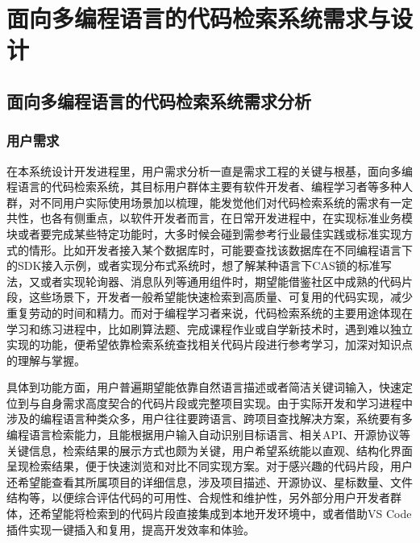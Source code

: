 \documentclass[UTF8,a4paper,12pt]{ctexart}
\numberwithin{equation}{section}
\begin{document}
\section{面向多编程语言的代码检索系统需求与设计}
\subsection{面向多编程语言的代码检索系统需求分析}
\subsubsection{用户需求}
在本系统设计开发进程里，用户需求分析一直是需求工程的关键与根基，面向多编程语言的代码检索系统，其目标用户群体主要有软件开发者、编程学习者等多种人群，对不同用户实际使用场景加以梳理，能发觉他们对代码检索系统的需求有一定共性，也各有侧重点，以软件开发者而言，在日常开发进程中，在实现标准业务模块或者要完成某些特定功能时，大多时候会碰到需参考行业最佳实践或标准实现方式的情形。比如开发者接入某个数据库时，可能要查找该数据库在不同编程语言下的SDK接入示例，或者实现分布式系统时，想了解某种语言下CAS锁的标准写法，又或者实现轮询器、消息队列等通用组件时，期望能借鉴社区中成熟的代码片段，这些场景下，开发者一般希望能快速检索到高质量、可复用的代码实现，减少重复劳动的时间和精力。而对于编程学习者来说，代码检索系统的主要用途体现在学习和练习进程中，比如刷算法题、完成课程作业或自学新技术时，遇到难以独立实现的功能，便希望依靠检索系统查找相关代码片段进行参考学习，加深对知识点的理解与掌握。\par
具体到功能方面，用户普遍期望能依靠自然语言描述或者简洁关键词输入，快速定位到与自身需求高度契合的代码片段或完整项目实现。由于实际开发和学习进程中涉及的编程语言种类众多，用户往往要跨语言、跨项目查找解决方案，系统要有多编程语言检索能力，且能根据用户输入自动识别目标语言、相关API、开源协议等关键信息，检索结果的展示方式也颇为关键，用户希望系统能以直观、结构化界面呈现检索结果，便于快速浏览和对比不同实现方案。对于感兴趣的代码片段，用户还希望能查看其所属项目的详细信息，涉及项目描述、开源协议、星标数量、文件结构等，以便综合评估代码的可用性、合规性和维护性，另外部分用户开发者群体，还希望能将检索到的代码片段直接集成到本地开发环境中，或者借助VS Code插件实现一键插入和复用，提高开发效率和体验。\par
\end{document}
